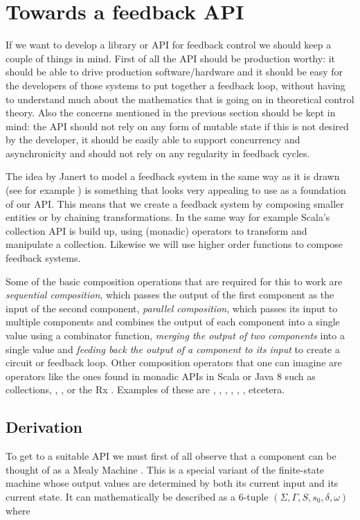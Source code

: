 \section{Towards a feedback API}
If we want to develop a library or API for feedback control we should keep a couple of things in mind. First of all the API should be production worthy: it should be able to drive production software/hardware and it should be easy for the developers of those systems to put together a feedback loop, without having to understand much about the mathematics that is going on in theoretical control theory. Also the concerns mentioned in the previous section should be kept in mind: the API should not rely on any form of mutable state if this is not desired by the developer, it should be easily able to support concurrency and asynchronicity and should not rely on any regularity in feedback cycles.

The idea by Janert to model a feedback system in the same way as it is drawn (see for example ) is something that looks very appealing to use as a foundation of our API. This means that we create a feedback system by composing smaller entities or by chaining transformations. In the same way for example Scala's collection API is build up, using (monadic) operators to transform and manipulate a collection. Likewise we will use higher order functions to compose feedback systems.

Some of the basic composition operations that are required for this to work are \textit{sequential composition}, which passes the output of the first component as the input of the second component, \textit{parallel composition}, which passes its input to multiple components and combines the output of each component into a single value using a combinator function, \textit{merging the output of two components} into a single value and \textit{feeding back the output of a component to its input} to create a circuit or feedback loop. Other composition operators that one can imagine are operators like the ones found in monadic APIs in Scala or Java 8 such as collections, , ,  or the Rx \obs. Examples of these are , , , , , , etcetera.

\subsection{Derivation}
To get to a suitable API we must first of all observe that a component can be thought of as a Mealy Machine \cite{mealy1955-mealymachine}. This is a special variant of the finite-state machine whose output values are determined by both its current input and its current state. It can mathematically be described as a 6-tuple $(\Sigma, \Gamma, S, s_0, \delta, \omega)$ \cite{carroll1989-theoryoffiniteautomata} where

